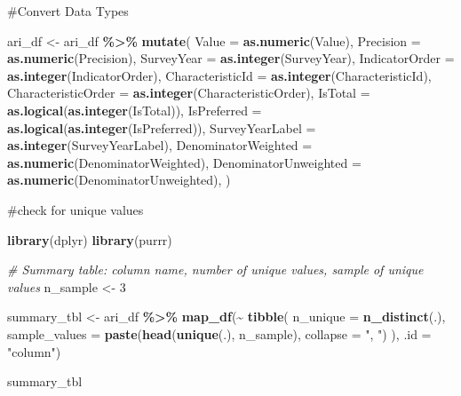 \documentclass[
]{article}
\newenvironment{Shaded}{\begin{snugshade}}{\end{snugshade}}
\newcommand{\AttributeTok}[1]{\textcolor[rgb]{0.13,0.29,0.53}{#1}}
\newcommand{\CommentTok}[1]{\textcolor[rgb]{0.56,0.35,0.01}{\textit{#1}}}
\newcommand{\DecValTok}[1]{\textcolor[rgb]{0.00,0.00,0.81}{#1}}
\newcommand{\FunctionTok}[1]{\textcolor[rgb]{0.13,0.29,0.53}{\textbf{#1}}}
\newcommand{\NormalTok}[1]{#1}
\newcommand{\OtherTok}[1]{\textcolor[rgb]{0.56,0.35,0.01}{#1}}
\newcommand{\SpecialCharTok}[1]{\textcolor[rgb]{0.81,0.36,0.00}{\textbf{#1}}}
\newcommand{\StringTok}[1]{\textcolor[rgb]{0.31,0.60,0.02}{#1}}
\begin{document}
\#Convert Data Types

\begin{Shaded}
\begin{Highlighting}[]
\NormalTok{ari\_df }\OtherTok{\textless{}{-}}\NormalTok{ ari\_df }\SpecialCharTok{\%\textgreater{}\%}
  \FunctionTok{mutate}\NormalTok{(}
        \AttributeTok{Value =} \FunctionTok{as.numeric}\NormalTok{(Value),}
    \AttributeTok{Precision =} \FunctionTok{as.numeric}\NormalTok{(Precision),}
    \AttributeTok{SurveyYear =} \FunctionTok{as.integer}\NormalTok{(SurveyYear),}
    \AttributeTok{IndicatorOrder =} \FunctionTok{as.integer}\NormalTok{(IndicatorOrder),}
    \AttributeTok{CharacteristicId =} \FunctionTok{as.integer}\NormalTok{(CharacteristicId),}
    \AttributeTok{CharacteristicOrder =} \FunctionTok{as.integer}\NormalTok{(CharacteristicOrder),}
    \AttributeTok{IsTotal =} \FunctionTok{as.logical}\NormalTok{(}\FunctionTok{as.integer}\NormalTok{(IsTotal)),}
    \AttributeTok{IsPreferred =} \FunctionTok{as.logical}\NormalTok{(}\FunctionTok{as.integer}\NormalTok{(IsPreferred)),}
    \AttributeTok{SurveyYearLabel =} \FunctionTok{as.integer}\NormalTok{(SurveyYearLabel),}
    \AttributeTok{DenominatorWeighted =} \FunctionTok{as.numeric}\NormalTok{(DenominatorWeighted),}
    \AttributeTok{DenominatorUnweighted =} \FunctionTok{as.numeric}\NormalTok{(DenominatorUnweighted),}
\NormalTok{  )}
\end{Highlighting}
\end{Shaded}

\#check for unique values

\begin{Shaded}
\begin{Highlighting}[]
\FunctionTok{library}\NormalTok{(dplyr)}
\FunctionTok{library}\NormalTok{(purrr)}

\CommentTok{\# Summary table: column name, number of unique values, sample of unique values}
\NormalTok{n\_sample }\OtherTok{\textless{}{-}} \DecValTok{3}

\NormalTok{summary\_tbl }\OtherTok{\textless{}{-}}\NormalTok{ ari\_df }\SpecialCharTok{\%\textgreater{}\%}
  \FunctionTok{map\_df}\NormalTok{(}\SpecialCharTok{\textasciitilde{}} \FunctionTok{tibble}\NormalTok{(}
    \AttributeTok{n\_unique =} \FunctionTok{n\_distinct}\NormalTok{(.),}
    \AttributeTok{sample\_values =} \FunctionTok{paste}\NormalTok{(}\FunctionTok{head}\NormalTok{(}\FunctionTok{unique}\NormalTok{(.), n\_sample), }\AttributeTok{collapse =} \StringTok{", "}\NormalTok{)}
\NormalTok{  ), }\AttributeTok{.id =} \StringTok{"column"}\NormalTok{)}


\NormalTok{summary\_tbl}
\end{Highlighting}
\end{Shaded}
\end{document}
